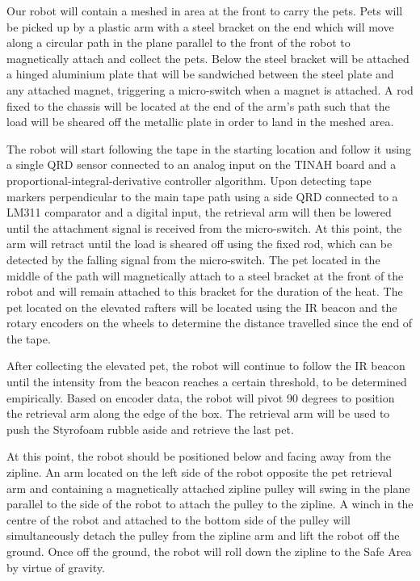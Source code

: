 \documentclass[11pt, oneside]{article} %
\begin{document}
Our robot will contain a meshed in area at the front to carry the pets. Pets will be picked up by a plastic arm with a steel bracket on the end which will move along a circular path in the plane parallel to the front of the robot to magnetically attach and collect the pets. Below the steel bracket will be attached a hinged aluminium plate that will be sandwiched between the steel plate and any attached magnet, triggering a micro-switch when a magnet is attached. A rod fixed to the chassis will be located at the end of the arm's path such that the load will be sheared off the metallic plate in order to land in the meshed area.

The robot will start following the tape in the starting location and follow it using a single QRD sensor connected to an analog input on the TINAH board and a proportional-integral-derivative controller algorithm. Upon detecting tape markers perpendicular to the main tape path using a side QRD connected to a LM311 comparator and a digital input, the retrieval arm will then be lowered until the attachment signal is received from the micro-switch. At this point, the arm will retract until the load is sheared off using the fixed rod, which can be detected by the falling signal from the micro-switch. The pet located in the middle of the path will magnetically attach to a steel bracket at the front of the robot and will remain attached to this bracket for the duration of the heat. The pet located on the elevated rafters will be located using the IR beacon and the rotary encoders on the wheels to determine the distance travelled since the end of the tape.

After collecting the elevated pet, the robot will continue to follow the IR beacon until the intensity from the beacon reaches a certain threshold, to be determined empirically. Based on encoder data, the robot will pivot 90 degrees to position the retrieval arm along the edge of the box. The retrieval arm will be used to push the Styrofoam rubble aside and retrieve the last pet.

At this point, the robot should be positioned below and facing away from the zipline. An arm located on the left side of the robot opposite the pet retrieval arm and containing a magnetically attached zipline pulley will swing in the plane parallel to the side of the robot to attach the pulley to the zipline. A winch in the centre of the robot and attached to the bottom side of the pulley will simultaneously detach the pulley from the zipline arm and lift the robot off the ground. Once off the ground, the robot will roll down the zipline to the Safe Area by virtue of gravity.
\end{document}
